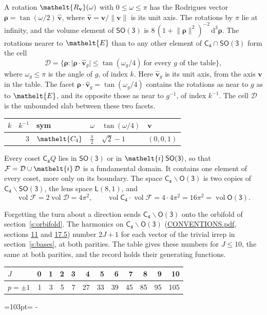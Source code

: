 \documentclass[10pt,a4paper]{article}
\newcommand{\needspace}[1]{\par\penalty-100\begingroup\dimen0=#1\relax\dimen2=\pagegoal
  \advance\dimen2-\pagetotal\ifdim\dimen0>\dimen2\relax\ifdim\dimen2>0pt\vfil\break\fi\fi
  \endgroup}
\numberwithin{equation}{section}
\newcommand{\eltfont}[1]{{\let\sigma\eltsigma\mathelt{#1}}}
\newcommand{\grp}[1]{\mathsf{#1}}
\newcommand{\cls}[1]{\eltfont{#1}}
\newcommand{\elt}[1]{\eltfont{#1}}
\newcommand{\dirvec}[3]{(#1, #2, #3)}
\newcommand{\unitaxis}{\hat{\mathbf{v}}}
\newcommand{\vv}{\mathbf{v}}
\newcommand{\diff}{\mathrm{d}}
\newcommand{\vol}{\operatorname{vol}}
\newcommand{\rodrigues}{\boldsymbol{\rho}}
\newcommand{\fcell}{\mathcal{D}}
\newcommand{\fdomain}{\mathcal{F}}
\newcommand{\lensspace}[2]{\mathsf{L}(#1, #2)}
\begin{document}
\leavevmode\label{n:vector.rodrigues}\label{n:vector.unitaxis}A rotation $\elt{R_{\vv}}(\omega)$ with $0 \le \omega \le \pi$ has the Rodrigues vector $\rodrigues = \tan(\omega/2)\,\unitaxis$, where $\unitaxis = \vv/\lVert\vv\rVert$ is its unit axis. The rotations by $\pi$ lie at infinity, and the volume element of \href{SO3.pdf}{$\grp{SO(3)}$} is $8\,(1 + \lVert\rodrigues\rVert^2)^{-2}\,\diff^3\rodrigues$.
\leavevmode\label{n:set.cell}The rotations nearer to $\elt{E}$ than to any other element of $\grp{C_{4}} \cap \grp{SO(3)}$ form the cell
\begin{equation}\label{e:cell}\fcell = \bigl\{\rodrigues : \lvert\rodrigues\cdot\unitaxis_g\rvert \le \tan(\omega_g/4)\ \text{for every $g$ of the table}\bigr\},\end{equation}
where $\omega_g \le \pi$ is the angle of $g$, of index $k$. Here $\unitaxis_g$ is its unit axis, from the axis $\vv$ in the table. The facet $\rodrigues\cdot\unitaxis_g = \tan(\omega_g/4)$ contains the rotations as near to $g$ as to $\elt{E}$, and its opposite those as near to $g^{-1}$, of index $k^{-1}$. The cell $\fcell$ is the unbounded slab between these two facets.
{\small{\renewcommand{\arraystretch}{1.3}\begin{longtable}{@{}rrllll@{}}\toprule
$k$ & $k^{-1}$ & sym & $\omega$ & $\tan(\omega/4)$ & $\vv$\\\midrule\endhead
\bottomrule\endfoot\endlastfoot
1 & 3 & $\cls{C_{4}}$ & $\tfrac{\pi}{2}$ & $\sqrt{2} - 1$ & $\dirvec{0}{0}{1}$\\
\bottomrule\end{longtable}}}

\leavevmode\label{n:set.fundamental}Every coset $\grp{C_{4}}Q$ lies in \href{SO3.pdf}{$\grp{SO(3)}$} or in $\elt{i}\,\grp{SO(3)}$, so that $\fdomain = \fcell \cup \elt{i}\,\fcell$ is a fundamental domain. It contains one element of every coset, more only on its boundary.
\leavevmode\label{n:set.lens}The space $\grp{C_{4}}\backslash\grp{O(3)}$ is two copies of $\grp{C_{4}}\backslash\grp{SO(3)}$, the lens space $\lensspace{8}{1}$, and
\begin{equation}\label{e:volume}\vol\fdomain = 2\vol\fcell = 4\pi^2,\qquad \vol\grp{C_{4}}\cdot\vol\fdomain = 4\cdot 4\pi^2 = 16\pi^2 = \vol\grp{O(3)}.\end{equation}

Forgetting the turn about a direction sends $\grp{C_{4}}\backslash\grp{O(3)}$ onto the orbifold of section~\ref{s:orbifold}.
The harmonics on $\grp{C_{4}}\backslash\grp{O(3)}$ (\href{../../CONVENTIONS.pdf}{CONVENTIONS.pdf}, sections \href{../../CONVENTIONS.pdf\#conv.11}{11} and \href{../../CONVENTIONS.pdf\#conv.17.5}{17.5}) number $2J + 1$ for each vector of the trivial irrep in section~\ref{s:bases}, at both parities. The table gives these numbers for $J \le 10$, the same at both parities, and the record holds their generating functions.
{\small\setlength{\tabcolsep}{4pt}\begin{longtable}{@{}lrrrrrrrrrrr@{}}\toprule
$J$ & 0 & 1 & 2 & 3 & 4 & 5 & 6 & 7 & 8 & 9 & 10\\\midrule\endhead
\bottomrule\endfoot\endlastfoot
$p = \pm 1$ & 1 & 3 & 5 & 7 & 27 & 33 & 39 & 45 & 85 & 95 & 105\\
\bottomrule\end{longtable}}
\needspace{103pt}
\end{document}
